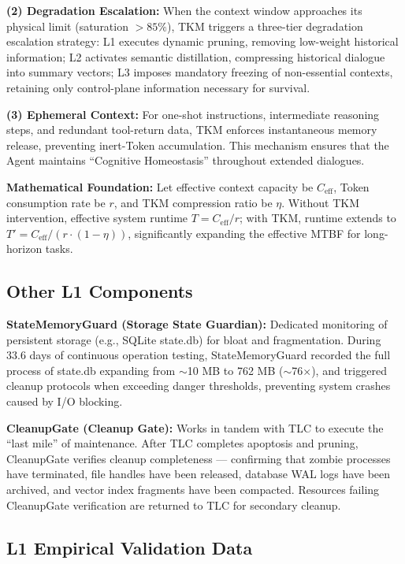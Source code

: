 \documentclass[11pt,a4paper]{article}
\begin{document}
\noindent\textbf{(2) Degradation Escalation:} When the context window approaches its physical limit (saturation $>85\%$), TKM triggers a three-tier degradation escalation strategy: L1 executes dynamic pruning, removing low-weight historical information; L2 activates semantic distillation, compressing historical dialogue into summary vectors; L3 imposes mandatory freezing of non-essential contexts, retaining only control-plane information necessary for survival.

\noindent\textbf{(3) Ephemeral Context:} For one-shot instructions, intermediate reasoning steps, and redundant tool-return data, TKM enforces instantaneous memory release, preventing inert-Token accumulation. This mechanism ensures that the Agent maintains ``Cognitive Homeostasis'' throughout extended dialogues.

\textbf{Mathematical Foundation:} Let effective context capacity be $C_{\text{eff}}$, Token consumption rate be $r$, and TKM compression ratio be $\eta$. Without TKM intervention, effective system runtime $T = C_{\text{eff}} / r$; with TKM, runtime extends to $T' = C_{\text{eff}} / (r \cdot (1 - \eta))$, significantly expanding the effective MTBF for long-horizon tasks.

\subsection{Other L1 Components}

\textbf{StateMemoryGuard (Storage State Guardian):} Dedicated monitoring of persistent storage (e.g., SQLite state.db) for bloat and fragmentation. During 33.6 days of continuous operation testing, StateMemoryGuard recorded the full process of state.db expanding from $\sim$10 MB to 762 MB ($\sim$76$\times$), and triggered cleanup protocols when exceeding danger thresholds, preventing system crashes caused by I/O blocking.

\textbf{CleanupGate (Cleanup Gate):} Works in tandem with TLC to execute the ``last mile'' of maintenance. After TLC completes apoptosis and pruning, CleanupGate verifies cleanup completeness --- confirming that zombie processes have terminated, file handles have been released, database WAL logs have been archived, and vector index fragments have been compacted. Resources failing CleanupGate verification are returned to TLC for secondary cleanup.

\subsection{L1 Empirical Validation Data}
\end{document}
